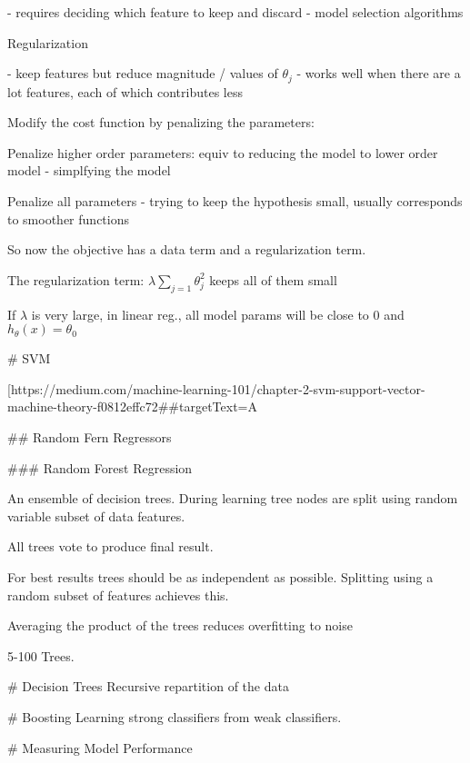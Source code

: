 - requires deciding which feature to keep and discard
- model selection algorithms

Regularization

- keep features but reduce magnitude / values of $\theta_j$ 
- works well when there are a lot features, each of which contributes less

Modify the cost function by penalizing the parameters:

Penalize higher order parameters: equiv to reducing the model to lower order model - simplfying the model

Penalize all parameters  - trying to keep the hypothesis small, usually corresponds to smoother functions

So now the objective has a data term and a regularization term.

The regularization term: $\lambda\sum_{j=1} \theta_j^2 $ keeps all of them small

If $\lambda $ is very large, in linear reg., all model params will be close to 0 and $h_\theta(x) = \theta_0$  

# SVM

[https://medium.com/machine-learning-101/chapter-2-svm-support-vector-machine-theory-f0812effc72##targetText=A%

## Random Fern Regressors

### Random Forest Regression

An ensemble of decision trees. During learning tree nodes are split using random variable subset of data features.

All trees vote to produce final result.

For best results trees should be as independent as possible. Splitting using a random subset of features achieves this.

Averaging the product of the trees reduces overfitting to noise

5-100 Trees.

# Decision Trees
Recursive repartition of the data



# Boosting
Learning strong classifiers from weak classifiers.



# Measuring Model Performance

